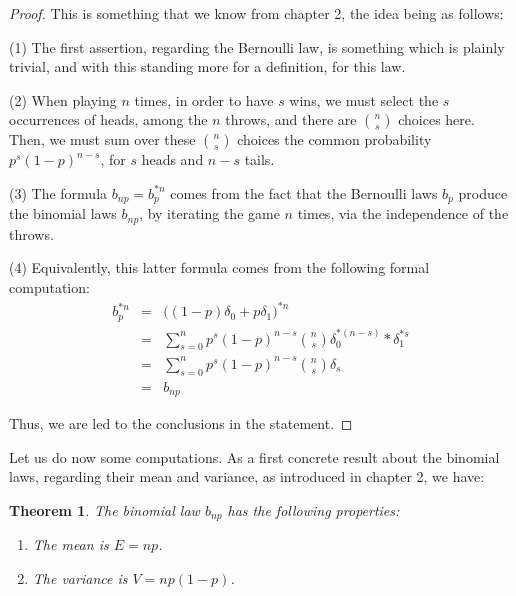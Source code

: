 \documentclass[12pt]{amsbook}
\newtheorem{theorem}{Theorem}[chapter]
\begin{document}
\begin{proof}
This is something that we know from chapter 2, the idea being as follows:

\medskip

(1) The first assertion, regarding the Bernoulli law, is something which is plainly trivial, and with this standing more for a definition, for this law.

\medskip

(2) When playing $n$ times, in order to have $s$ wins, we must select the $s$ occurrences of heads, among the $n$ throws, and there are $\binom{n}{s}$ choices here. Then, we must sum over these $\binom{n}{s}$ choices the common probability $p^s(1-p)^{n-s}$, for $s$ heads and $n-s$ tails.
\medskip

(3) The formula $b_{np}=b_p^{*n}$ comes from the fact that the Bernoulli laws $b_p$ produce the binomial laws $b_{np}$, by iterating the game $n$ times, via the independence of the throws. 

\medskip

(4) Equivalently, this latter formula comes from the following formal computation:
\begin{eqnarray*}
b_p^{*n}
&=&\big((1-p)\delta_0+p\delta_1\big)^{*n}\\
&=&\sum_{s=0}^np^s(1-p)^{n-s}\binom{n}{s}\delta_0^{*(n-s)}*\delta_1^{*s}\\
&=&\sum_{s=0}^np^s(1-p)^{n-s}\binom{n}{s}\delta_s\\
&=&b_{np}
\end{eqnarray*}

Thus, we are led to the conclusions in the statement.
\end{proof}

Let us do now some computations. As a first concrete result about the binomial laws, regarding their mean and variance, as introduced in chapter 2, we have:


\begin{theorem}
The binomial law $b_{np}$ has the following properties:
\begin{enumerate}
\item The mean is $E=np$.

\item The variance is $V=np(1-p)$.
\end{enumerate}
\end{theorem}
\end{document}
